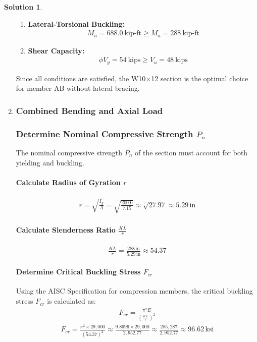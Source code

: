 \documentclass[12pt]{article}
\theoremstyle{definition} %
\newtheorem{solution}{Solution}
\theoremstyle{plain} %
\begin{document}
\begin{solution}
\begin{enumerate}
\begin{enumerate}
    \item \textbf{Lateral-Torsional Buckling:}
    \begin{align}
    M_n = 688.0~\text{kip-ft} \geq M_u = 288~\text{kip-ft}
    \end{align}
    
    \item \textbf{Shear Capacity:}
    \begin{align}
    \phi V_y = 54~\text{kips} \geq V_u = 48~\text{kips}
    \end{align}
\end{enumerate}

Since all conditions are satisfied, the W10$\times$12 section is the optimal choice for member AB without lateral bracing.


\hrulefill

\item \subsubsection*{Combined Bending and Axial Load}

\subsubsection*{Determine Nominal Compressive Strength \( P_n \)}
The nominal compressive strength \( P_n \) of the section must account for both yielding and buckling. 

\paragraph*{Calculate Radius of Gyration \( r \)}
\begin{align}
r = \sqrt{\frac{I_y}{A}} = \sqrt{\frac{200.0}{7.15}} \approx \sqrt{27.97} \approx 5.29 \, \text{in}
\end{align}

\paragraph*{Calculate Slenderness Ratio \( \frac{KL}{r} \)}
\begin{align}
\frac{KL}{r} = \frac{288 \, \text{in}}{5.29 \, \text{in}} \approx 54.37
\end{align}

\paragraph*{Determine Critical Buckling Stress \( F_{cr} \)}
Using the AISC Specification for compression members, the critical buckling stress \( F_{cr} \) is calculated as:
\begin{align}
F_{cr} = \frac{\pi^2 E}{\left( \frac{KL}{r} \right)^2}
\end{align}
\begin{align}
F_{cr} = \frac{\pi^2 \times 29{,}000}{(54.37)^2} \approx \frac{9.8696 \times 29{,}000}{2{,}952.77} \approx \frac{285{,}287}{2{,}952.77} \approx 96.62 \, \text{ksi}
\end{align}


\end{enumerate}
\end{solution}
\end{document}
